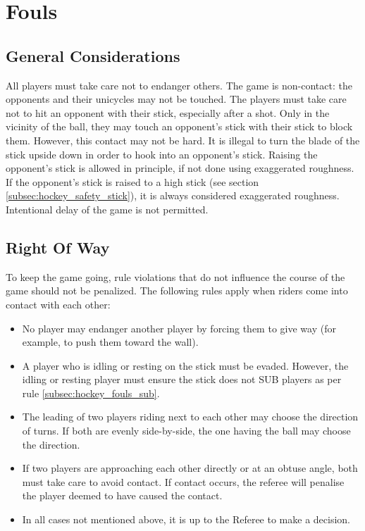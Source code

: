 \section{Fouls}

\subsection{General Considerations}
All players must take care not to endanger others.
The game is non-contact: the opponents and their unicycles may not be touched.
The players must take care not to hit an opponent with their stick, especially after a shot.
Only in the vicinity of the ball, they may touch an opponent's stick with their stick to block them.
However, this contact may not be hard.
It is illegal to turn the blade of the stick upside down in order to hook into an opponent's stick.
Raising the opponent's stick is allowed in principle, if not done using exaggerated roughness.
If the opponent's stick is raised to a high stick (see section \ref{subsec:hockey_safety_stick}), it is always considered exaggerated roughness.
Intentional delay of the game is not permitted.

\subsection{Right Of Way}
To keep the game going, rule violations that do not influence the course of the game should not be penalized.
The following rules apply when riders come into contact with each other:
\begin{itemize}
\item No player may endanger another player by forcing them to give way (for example, to push them toward the wall).
\item A player who is idling or resting on the stick must be evaded.
  However, the idling or resting player must ensure the stick does not SUB players as per rule \ref{subsec:hockey_fouls_sub}.
\item The leading of two players riding next to each other may choose the direction of turns.
If both are evenly side-by-side, the one having the ball may choose the direction.
\item If two players are approaching each other directly or at an obtuse angle, both must take care to avoid contact.
  If contact occurs, the referee will penalise the player deemed to have caused the contact.
\item In all cases not mentioned above, it is up to the Referee to make a decision.
\end{itemize}


